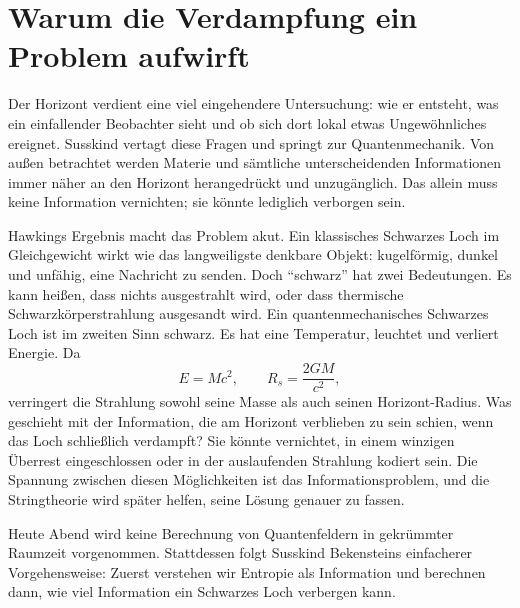 \begin{classroomqa}
\end{classroomqa}

\section{Warum die Verdampfung ein Problem aufwirft}

Der Horizont verdient eine viel eingehendere Untersuchung: wie er entsteht, was ein einfallender Beobachter sieht und ob sich dort lokal etwas Ungewöhnliches ereignet. Susskind vertagt diese Fragen und springt zur Quantenmechanik. Von außen betrachtet werden Materie und sämtliche unterscheidenden Informationen immer näher an den Horizont herangedrückt und unzugänglich. Das allein muss keine Information vernichten; sie könnte lediglich verborgen sein.

Hawkings Ergebnis macht das Problem akut. Ein klassisches Schwarzes Loch im Gleichgewicht wirkt wie das langweiligste denkbare Objekt: kugelförmig, dunkel und unfähig, eine Nachricht zu senden. Doch ``schwarz'' hat zwei Bedeutungen. Es kann heißen, dass nichts ausgestrahlt wird, oder dass thermische Schwarzkörperstrahlung ausgesandt wird. Ein quantenmechanisches Schwarzes Loch ist im zweiten Sinn schwarz. Es hat eine Temperatur, leuchtet und verliert Energie. Da
\begin{equation}
E=Mc^2,
\qquad
R_s=\frac{2GM}{c^2},
\end{equation}
verringert die Strahlung sowohl seine Masse als auch seinen Horizont-Radius. Was geschieht mit der Information, die am Horizont verblieben zu sein schien, wenn das Loch schließlich verdampft? Sie könnte vernichtet, in einem winzigen Überrest eingeschlossen oder in der auslaufenden Strahlung kodiert sein. Die Spannung zwischen diesen Möglichkeiten ist das Informationsproblem, und die Stringtheorie wird später helfen, seine Lösung genauer zu fassen.

Heute Abend wird keine Berechnung von Quantenfeldern in gekrümmter Raumzeit vorgenommen. Stattdessen folgt Susskind Bekensteins einfacherer Vorgehensweise: Zuerst verstehen wir Entropie als Information und berechnen dann, wie viel Information ein Schwarzes Loch verbergen kann.

